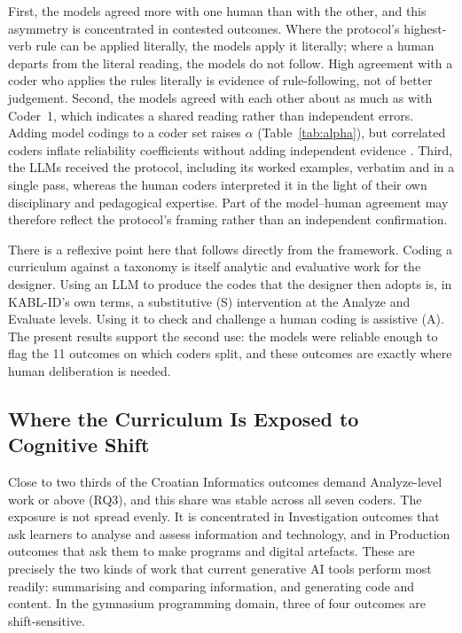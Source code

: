 \documentclass[journal,article,submit,pdftex,moreauthors]{Definitions/mdpi}
\begin{document}
First, the models agreed more with one human than with the other, and this asymmetry is concentrated in contested outcomes. Where the protocol's highest-verb rule can be applied literally, the models apply it literally; where a human departs from the literal reading, the models do not follow. High agreement with a coder who applies the rules literally is evidence of rule-following, not of better judgement. Second, the models agreed with each other about as much as with Coder~1, which indicates a shared reading rather than independent errors. Adding model codings to a coder set raises $\alpha$ (Table~\ref{tab:alpha}), but correlated coders inflate reliability coefficients without adding independent evidence \cite{krippendorff_2018}. Third, the LLMs received the protocol, including its worked examples, verbatim and in a single pass, whereas the human coders interpreted it in the light of their own disciplinary and pedagogical expertise. Part of the model--human agreement may therefore reflect the protocol's framing rather than an independent confirmation.

There is a reflexive point here that follows directly from the framework. Coding a curriculum against a taxonomy is itself analytic and evaluative work for the designer. Using an LLM to produce the codes that the designer then adopts is, in KABL-ID's own terms, a substitutive (S) intervention at the Analyze and Evaluate levels. Using it to check and challenge a human coding is assistive (A). The present results support the second use: the models were reliable enough to flag the 11 outcomes on which coders split, and these outcomes are exactly where human deliberation is needed.

\subsection{Where the Curriculum Is Exposed to Cognitive Shift}

Close to two thirds of the Croatian Informatics outcomes demand Analyze-level work or above (RQ3), and this share was stable across all seven coders. The exposure is not spread evenly. It is concentrated in Investigation outcomes that ask learners to analyse and assess information and technology, and in Production outcomes that ask them to make programs and digital artefacts. These are precisely the two kinds of work that current generative AI tools perform most readily: summarising and comparing information, and generating code and content. In the gymnasium programming domain, three of four outcomes are shift-sensitive.
\end{document}
